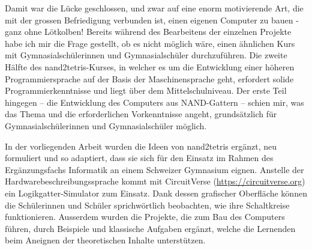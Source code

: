 Damit war die Lücke geschlossen, und zwar auf eine enorm motivierende Art, die mit der grossen Befriedigung verbunden ist, einen eigenen Computer zu bauen - ganz ohne Lötkolben! Bereits während des Bearbeitens der einzelnen Projekte habe ich mir die Frage gestellt, ob es nicht möglich wäre, einen ähnlichen Kurs mit Gymnasialschülerinnen und Gymnasialschüler durchzuführen. Die zweite Hälfte des nand2tetris-Kurses, in welcher es um die Entwicklung einer höheren Programmiersprache auf der Basis der Maschinensprache geht, erfordert solide Programmierkenntnisse und liegt über dem Mittelschulniveau. Der erste Teil hingegen -- die Entwicklung des Computers aus NAND-Gattern -- schien mir, was das Thema und die erforderlichen Vorkenntnisse angeht, grundsätzlich für Gymnasialschülerinnen und Gymnasialschüler möglich. 


In der vorliegenden Arbeit wurden die Ideen von nand2tetris ergänzt, neu formuliert und so adaptiert, dass sie sich für den Einsatz im Rahmen des Ergänzungsfachs Informatik an einem Schweizer Gymnasium eignen. Anstelle der Hardwarebeschreibungssprache kommt mit CircuitVerse (\url{https://circuitverse.org}) ein Logikgatter-Simulator zum Einsatz. Dank dessen grafischer Oberfläche können die Schülerinnen und Schüler sprichwörtlich beobachten, wie ihre Schaltkreise funktionieren. Ausserdem wurden die Projekte, die zum Bau des Computers führen, durch Beispiele und klassische Aufgaben ergänzt, welche die Lernenden beim Aneignen der theoretischen Inhalte unterstützen. 

